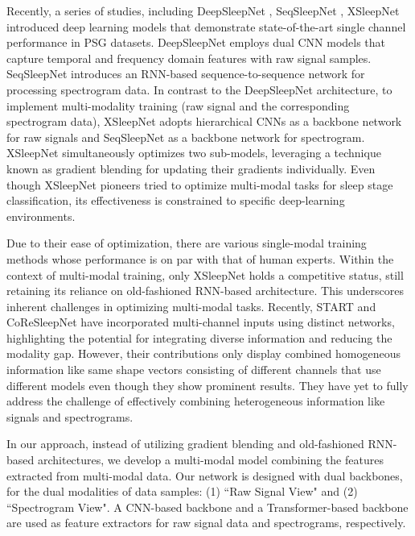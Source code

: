 
Recently, a series of studies, including DeepSleepNet \cite{supratak2017deepsleepnet}, SeqSleepNet \cite{phan2019seqsleepnet}, XSleepNet \cite{phan2021xsleepnet} introduced deep learning models that demonstrate state-of-the-art single channel performance in PSG datasets.
DeepSleepNet employs dual CNN models that capture temporal and frequency domain features with raw signal samples. 
SeqSleepNet introduces an RNN-based sequence-to-sequence network for processing spectrogram data.
In contrast to the DeepSleepNet architecture, to implement multi-modality training (raw signal and the corresponding spectrogram data), XSleepNet adopts hierarchical CNNs as a backbone network for raw signals and SeqSleepNet as a backbone network for spectrogram.
%
XSleepNet simultaneously optimizes two sub-models, leveraging a technique known as gradient blending \cite{what_makes_training_muli-modal_hard} for updating their gradients individually. 
%
Even though XSleepNet pioneers tried to optimize multi-modal tasks for sleep stage classification,
%
its effectiveness is constrained to specific deep-learning environments.



Due to their ease of optimization, there are various single-modal
%
training methods whose performance is on par with that of human experts. 
Within the context of multi-modal training, only XSleepNet holds a competitive status, still retaining its reliance on old-fashioned RNN-based architecture. This underscores inherent challenges in optimizing multi-modal tasks.
%
Recently, START \cite{10385393} and CoReSleepNet \cite{kontras2023coresleep} have incorporated multi-channel inputs using distinct networks, highlighting the potential for integrating diverse information and reducing the modality gap.
%
However, their contributions only display combined homogeneous information like same shape vectors consisting of different channels that use different models even though they show prominent results. They have yet to fully address the challenge of effectively combining heterogeneous information like signals and spectrograms.


In our approach, instead of utilizing gradient blending and old-fashioned RNN-based architectures, we develop a multi-modal model
combining the features extracted from multi-modal data.
%
Our network is designed with dual backbones, for the dual modalities of data samples: (1) ``Raw Signal View" and (2) ``Spectrogram View". 
A CNN-based backbone and a Transformer-based backbone are used as feature extractors for raw signal data and spectrograms, respectively. 
%

